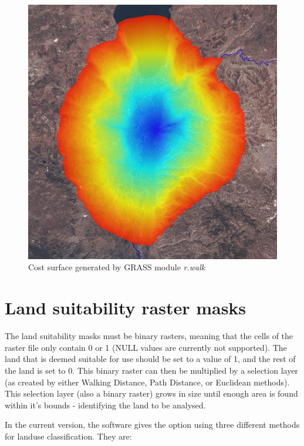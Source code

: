 \begin{figure}[htbp] \centering
\includegraphics[scale=0.29]{./images/rwalkShuna.jpg}
   \caption{Cost surface generated by GRASS module
   \textit{r.walk}} \label{fig:rwalk} \end{figure}

\section{Land suitability raster masks} 

The land suitability masks must be binary rasters, meaning that the cells of
the raster file only contain 0 or 1 (NULL values are currently not supported).
The land that is deemed suitable for use should be set to a value of 1, and the
rest of the land is set to 0.  This binary raster  can then be multiplied by a
selection layer (as created by either Walking Distance, Path Distance,
or Euclidean methods).  This selection layer (also a binary raster) grows in size until enough area is
found within it's bounds - identifying the land to be analysed.

In the current version, the software gives the option using three different
methods for landuse classification.  They are: 

